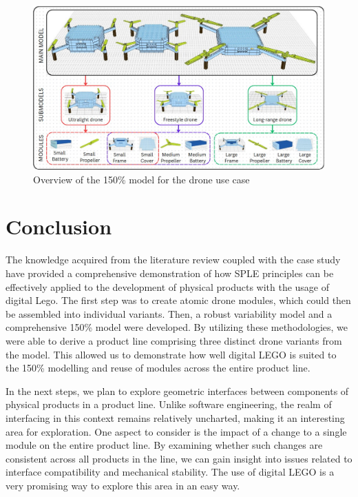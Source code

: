 \documentclass[sigconf,review]{acmart}
\begin{document}
\begin{figure}[htbp]
    \includegraphics[width=\textwidth]{./150_MODEL_6.jpg}
    \caption{Overview of the 150\% model for the drone use case}
    \label{fig:150-model}
\end{figure}


\section{Conclusion}
\label{sec:conclusion}

The knowledge acquired from the literature review coupled with the case study have provided a comprehensive demonstration of how SPLE principles can be effectively applied to the development of physical products with the usage of digital Lego. 
The first step was to create atomic drone modules, which could then be assembled into individual variants. 
Then, a robust variability model and a comprehensive 150\% model were developed. 
By utilizing these methodologies, we were able to derive a product line comprising three distinct drone variants from the model. 
This allowed us to demonstrate how well digital LEGO is suited to the 150\% modelling and reuse of modules across the entire product line.

In the next steps, we plan to explore geometric interfaces between components of physical products in a product line. Unlike software engineering, the realm of interfacing in this context remains relatively uncharted, making it an interesting area for exploration. 
One aspect to consider is the impact of a change to a single module on the entire product line. 
By examining whether such changes are consistent across all products in the line, we can gain insight into issues related to interface compatibility and mechanical stability. 
The use of digital LEGO is a very promising way to explore this area in an easy way.





\end{document}
